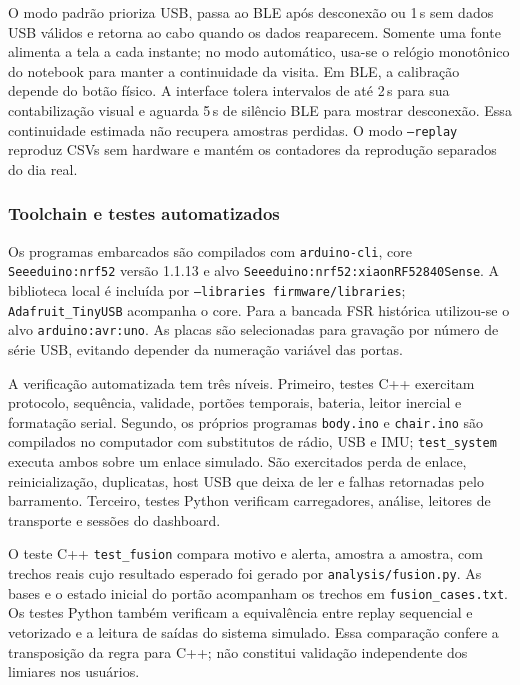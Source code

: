 O modo padrão prioriza USB, passa ao BLE após desconexão ou 1\,s
sem dados USB válidos e retorna ao cabo quando os dados reaparecem.
Somente uma fonte alimenta a tela a cada instante; no modo automático,
usa-se o relógio monotônico do notebook para manter a continuidade da
visita. Em BLE, a calibração depende do botão físico. A interface
tolera intervalos de até 2\,s para sua contabilização visual e
aguarda 5\,s de silêncio BLE para mostrar desconexão. Essa
continuidade estimada não recupera amostras perdidas. O modo
\texttt{--replay} reproduz CSVs sem hardware e mantém os contadores
da reprodução separados do dia real.

\subsubsection{Toolchain e testes automatizados}

Os programas embarcados são compilados com \texttt{arduino-cli},
core \texttt{Seeeduino:nrf52} versão 1.1.13 e alvo
\texttt{Seeeduino:nrf52:xiaonRF52840Sense}. A biblioteca local é
incluída por \texttt{--libraries firmware/libraries};
\texttt{Adafruit\_TinyUSB} acompanha o core. Para a bancada FSR
histórica utilizou-se o alvo \texttt{arduino:avr:uno}. As placas são
selecionadas para gravação por número de série USB, evitando depender
da numeração variável das portas.

A verificação automatizada tem três níveis. Primeiro, testes C++
exercitam protocolo, sequência, validade, portões temporais, bateria,
leitor inercial e formatação serial. Segundo, os próprios programas
\texttt{body.ino} e \texttt{chair.ino} são compilados no computador
com substitutos de rádio, USB e IMU; \texttt{test\_system} executa
ambos sobre um enlace simulado. São exercitados perda de enlace,
reinicialização, duplicatas, host USB que deixa de ler e falhas
retornadas pelo barramento. Terceiro, testes Python verificam
carregadores, análise, leitores de transporte e sessões do dashboard.

O teste C++ \texttt{test\_fusion} compara motivo e alerta, amostra a
amostra, com trechos reais cujo resultado esperado foi gerado por
\texttt{analysis/fusion.py}. As bases e o estado inicial do portão
acompanham os trechos em \texttt{fusion\_cases.txt}. Os testes Python
também verificam a equivalência entre replay sequencial e vetorizado
e a leitura de saídas do sistema simulado. Essa comparação confere a
transposição da regra para C++; não constitui validação independente
dos limiares nos usuários.

